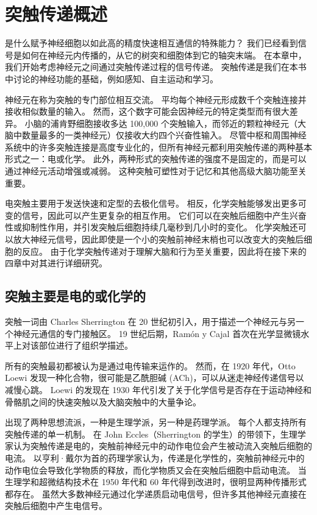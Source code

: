 \chapter{突触传递概述} \label{chap:chap11}

是什么赋予神经细胞以如此高的精度快速相互通信的特殊能力？
我们已经看到信号是如何在神经元内传播的，从它的树突和细胞体到它的轴突末端。
在本章中，我们开始考虑神经元之间通过突触传递过程的信号传递。
突触传递是我们在本书中讨论的神经功能的基础，例如感知、自主运动和学习。


神经元在称为突触的专门部位相互交流。
平均每个神经元形成数千个突触连接并接收相似数量的输入。
然而，这个数字可能会因神经元的特定类型而有很大差异。
小脑的浦肯野细胞接收多达 100,000 个突触输入，而邻近的颗粒神经元（大脑中数量最多的一类神经元）仅接收大约四个兴奋性输入。
尽管中枢和周围神经系统中的许多突触连接是高度专业化的，但所有神经元都利用突触传递的两种基本形式之一：电或化学。
此外，两种形式的突触传递的强度不是固定的，而是可以通过神经元活动增强或减弱。
这种突触可塑性对于记忆和其他高级大脑功能至关重要。


电突触主要用于发送快速和定型的去极化信号。
相反，化学突触能够发出更多可变的信号，因此可以产生更复杂的相互作用。
它们可以在突触后细胞中产生兴奋性或抑制性作用，并引发突触后细胞持续几毫秒到几小时的变化。
化学突触还可以放大神经元信号，因此即使是一个小的突触前神经末梢也可以改变大的突触后细胞的反应。
由于化学突触传递对于理解大脑和行为至关重要，因此将在接下来的四章中对其进行详细研究。



\section{突触主要是电的或化学的}

突触一词由 Charles Sherrington 在 20 世纪初引入，用于描述一个神经元与另一个神经元通信的专门接触区。
19 世纪后期，Ramón y Cajal 首次在光学显微镜水平上对该部位进行了组织学描述。


所有的突触最初都被认为是通过电传输来运作的。
然而，在 1920 年代，Otto Loewi 发现一种化合物，很可能是乙酰胆碱 (ACh)，可以从迷走神经传递信号以减慢心跳。
Loewi 的发现在 1930 年代引发了关于化学信号是否存在于运动神经和骨骼肌之间的快速突触以及大脑突触中的大量争论。


出现了两种思想流派，一种是生理学派，另一种是药理学派。
每个人都支持所有突触传递的单一机制。
在 John Eccles（Sherrington 的学生）的带领下，生理学家认为突触传递是电的，突触前神经元中的动作电位会产生被动流入突触后细胞的电流。
以亨利·戴尔为首的药理学家认为，传递是化学性的，突触前神经元中的动作电位会导致化学物质的释放，而化学物质又会在突触后细胞中启动电流。
当生理学和超微结构技术在 1950 年代和 60 年代得到改进时，很明显两种传播形式都存在。
虽然大多数神经元通过化学递质启动电信号，但许多其他神经元直接在突触后细胞中产生电信号。


